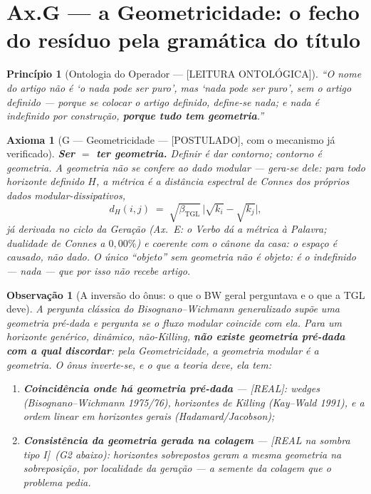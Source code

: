 \documentclass[11pt,a4paper]{article}
\newcommand{\REAL}{\textsf{[REAL]}}
\newcommand{\SOMBRA}{\textsf{[REAL na sombra tipo I]}}
\newcommand{\POST}{\textsf{[POSTULADO]}}
\newcommand{\ONTO}{\textsf{[LEITURA ONTOLÓGICA]}}
\newcommand{\bTGL}{\beta_{\mathrm{TGL}}}
\newtheorem{axiom}{Axioma}
\newtheorem{remark}{Observação}
\newtheorem{principle}{Princípio}
\begin{document}
\section{Ax.G --- a Geometricidade: o fecho do resíduo pela gramática do
título}\label{sec:geometricidade}
\begin{principle}[Ontologia do Operador --- \ONTO]
``O nome do artigo não é `\emph{o} nada pode ser puro', mas `nada pode
ser puro', sem o artigo definido --- porque se colocar o artigo
definido, define-se nada; e nada é indefinido por construção,
\textbf{porque tudo tem geometria}.''
\end{principle}

\begin{axiom}[G --- Geometricidade --- \POST, com o mecanismo já
verificado]\label{ax:G}
\textbf{Ser $=$ ter geometria.} Definir é dar contorno; contorno é
geometria. A geometria não se \emph{confere} ao dado modular --- 
\emph{gera-se} dele: para todo horizonte definido $H$, a métrica é a
distância espectral de Connes dos próprios dados
modular-dissipativos,
\begin{equation}
d_H(i,j)\;=\;\sqrt{\bTGL}\,\bigl|\sqrt{k_i}-\sqrt{k_j}\bigr|,
\end{equation}
já derivada no ciclo da Geração (Ax.~E: o Verbo dá a métrica à Palavra;
dualidade de Connes a $0{,}00\%$) e coerente com o cânone da casa:
\emph{o espaço é causado, não dado}. O único ``objeto'' sem geometria
não é objeto: é o indefinido --- nada --- que por isso não recebe artigo.
\end{axiom}

\begin{remark}[A inversão do ônus: o que o BW geral perguntava e o que a
TGL deve]
A pergunta clássica do Bisognano--Wichmann generalizado supõe uma
geometria \emph{pré-dada} e pergunta se o fluxo modular coincide com
ela. Para um horizonte genérico, dinâmico, não-Killing, \textbf{não
existe geometria pré-dada com a qual discordar}: pela Geometricidade, a
geometria modular \emph{é} a geometria. O ônus inverte-se, e o que a
teoria deve, ela tem:
\begin{enumerate}[noitemsep]
\item \textbf{Coincidência onde há geometria pré-dada} --- \REAL:
\emph{wedges} (Bisognano--Wichmann 1975/76), horizontes de Killing
(Kay--Wald 1991), e a ordem linear em horizontes gerais
(Hadamard/Jacobson);
\item \textbf{Consistência da geometria gerada na colagem} ---
\SOMBRA\ (G2 abaixo): horizontes sobrepostos geram a \emph{mesma}
geometria na sobreposição, por localidade da geração --- a semente da
colagem que o problema pedia.
\end{enumerate}
\end{remark}
\end{document}
